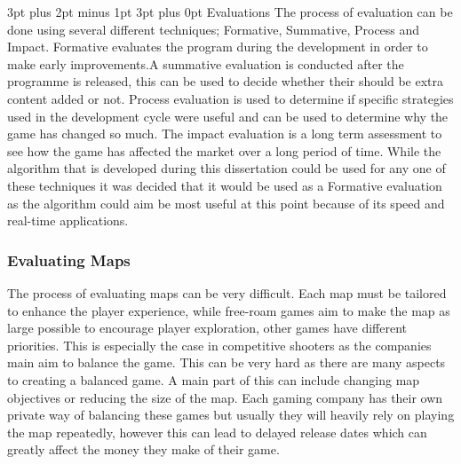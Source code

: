 \documentclass[12pt,a4paper,oneside]{book}
\makeatletter
\renewcommand\subsection{\@startsection {subsection}{1}{2mm} %
                               {3pt plus 2pt minus 1pt} %
                               {3pt plus 0pt} %
                               {\normalfont\bfseries}}
\makeatother
\begin{document}
\subsection{Evaluations}
The process of evaluation can be done using several different techniques; Formative, Summative, Process and Impact. Formative evaluates the program during the development in order to make early improvements.A summative evaluation is conducted after the programme is released, this can be used to decide whether their should be extra content added or not. Process evaluation is used to determine if specific strategies used in the development cycle were useful and can be used to determine why the game has changed so much. The impact evaluation is a long term assessment to see how the game has affected the market over a long period of time. While the algorithm that is developed during this dissertation could be used for any one of these techniques it was decided that it would be used as a Formative evaluation as the algorithm could aim be most useful at this point because of its speed and real-time applications.  
\subsubsection{Evaluating Maps}  
 The process of evaluating maps can be very difficult. Each map must be tailored to enhance the player experience, while free-roam games aim to make the map as large  possible to encourage player exploration, other games have different priorities. This is especially the case in competitive shooters as the companies main aim to balance the game. This can be very hard as there are many aspects to creating a balanced game. A main part of this can include changing map objectives or reducing the size of the map. Each gaming company has their own private way of balancing these games but usually they will heavily rely on playing the map repeatedly, however this can lead to delayed release dates which can greatly affect the money they make of their game.
\vspace{5mm} 
\newline
\end{document}
